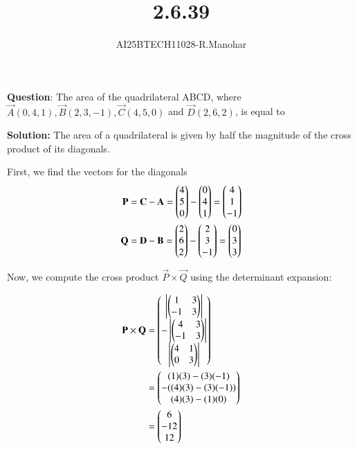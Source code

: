 \documentclass[journal]{IEEEtran}
\begin{document}

\vspace{3cm}

\title{2.6.39}
\author{AI25BTECH11028-R.Manohar}
 \maketitle
{\let\newpage\relax\maketitle}

\renewcommand{\thefigure}{\theenumi}
\renewcommand{\thetable}{\theenumi}
\setlength{\intextsep}{10pt} %


\renewcommand{\thetable}{\theenumi}

\textbf{Question}:
The area of the quadrilateral ABCD, where $\vec{A}(0,4,1), \vec{B}(2,3,-1), \vec{C}(4,5,0)$ and $\vec{D}(2,6,2)$, is equal to

\textbf{Solution:}  
The area of a quadrilateral is given by half the magnitude of the cross product of its diagonals.  

First, we find the vectors for the diagonals  
\begin{align*}
 \mathbf{P} &= \mathbf{C} - \mathbf{A} = \begin{pmatrix}4\\5\\0\end{pmatrix} - \begin{pmatrix}0\\4\\1\end{pmatrix} = \begin{pmatrix}4\\1\\-1\end{pmatrix} \\
 \mathbf{Q} &= \mathbf{D} - \mathbf{B} = \begin{pmatrix}2\\6\\2\end{pmatrix} - \begin{pmatrix}2\\3\\-1\end{pmatrix} = \begin{pmatrix}0\\3\\3\end{pmatrix} 
\end{align*}

Now, we compute the cross product $\vec{P} \times \vec{Q}$ using the determinant expansion:  

\begin{align*}
\mathbf{P} \times \mathbf{Q} &= 
\begin{pmatrix}
\left|\begin{pmatrix}1 & 3 \\ -1 & 3\end{pmatrix}\right| \\
-\left|\begin{pmatrix}4 & 3 \\ -1 & 3\end{pmatrix}\right| \\
\left|\begin{pmatrix}4 & 1 \\ 0 & 3\end{pmatrix}\right|
\end{pmatrix} \\
&= \begin{pmatrix}(1)(3) - (3)(-1) \\ -( (4)(3) - (3)(-1)) \\ (4)(3) - (1)(0)\end{pmatrix} \\
&= \begin{pmatrix}6 \\ -12 \\ 12\end{pmatrix}
\end{align*}
\end{document}
